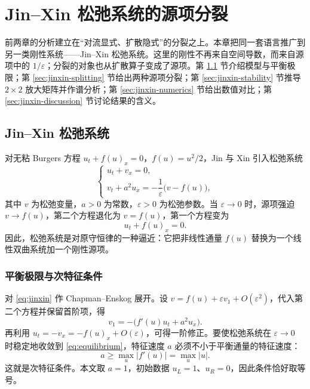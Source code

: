 \chapter{Jin--Xin 松弛系统的源项分裂}

前两章的分析建立在“对流显式、扩散隐式”的分裂之上。本章把同一套语言推广到另一类刚性系统——Jin--Xin 松弛系统。这里的刚性不再来自空间导数，而来自源项中的 $1/\varepsilon$；分裂的对象也从扩散算子变成了源项。第 \ref{sec:jinxin-model} 节介绍模型与平衡极限；第 \ref{sec:jinxin-splitting} 节给出两种源项分裂；第 \ref{sec:jinxin-stability} 节推导 $2\times2$ 放大矩阵并作谱分析；第 \ref{sec:jinxin-numerics} 节给出数值对比；第 \ref{sec:jinxin-discussion} 节讨论结果的含义。

\section{Jin--Xin 松弛系统}
\label{sec:jinxin-model}

对无粘 Burgers 方程 $u_t+f(u)_x=0$，$f(u)=u^2/2$，Jin 与 Xin 引入松弛系统\cite{jinxin1995}
\begin{equation}
  \begin{cases}
    u_t+v_x=0,\\[4pt]
    v_t+a^2u_x=-\dfrac{1}{\varepsilon}\bigl(v-f(u)\bigr),
  \end{cases}
  \label{eq:jinxin}
\end{equation}
其中 $v$ 为松弛变量，$a>0$ 为常数，$\varepsilon>0$ 为松弛参数。当 $\varepsilon\to0$ 时，源项强迫 $v\to f(u)$，第二个方程退化为 $v=f(u)$，第一个方程变为
\begin{equation}
  u_t+f(u)_x=0.
  \label{eq:equilibrium}
\end{equation}
因此，松弛系统是对原守恒律的一种逼近：它把非线性通量 $f(u)$ 替换为一个线性双曲系统加一个刚性源项。

\subsection{平衡极限与次特征条件}

对 \eqref{eq:jinxin} 作 Chapman--Enskog 展开。设 $v=f(u)+\varepsilon v_1+O(\varepsilon^2)$，代入第二个方程并保留首阶项，得
\begin{equation}
  v_1=-\bigl(f'(u)u_t+a^2u_x\bigr).
  \label{eq:chapman-enskog}
\end{equation}
再利用 $u_t=-v_x=-f(u)_x+O(\varepsilon)$，可得一阶修正。要使松弛系统在 $\varepsilon\to0$ 时稳定地收敛到 \eqref{eq:equilibrium}，特征速度 $a$ 必须不小于平衡通量的特征速度：
\begin{equation}
  a\ge\max_u|f'(u)|=\max_u|u|.
  \label{eq:subcharacteristic}
\end{equation}
这就是次特征条件。本文取 $a=1$，初始数据 $u_L=1$、$u_R=0$，因此条件恰好取等号。

